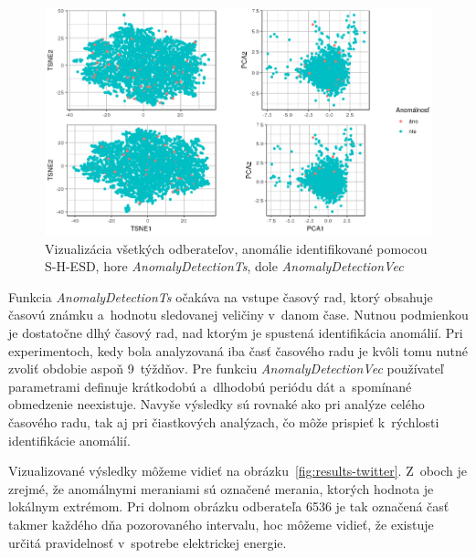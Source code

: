 \documentclass[a4paper,twoside,slovak,12pt,appendix]{article}
\begin{document}
\begin{figure}[htbp]
  \centering
  \includegraphics[width=\textwidth]{twitter_visualization.png}
  \caption[Vizualizácia všetkých odberateľov, anomálie identifikované pomocou S-H-ESD.]{Vizualizácia všetkých odberateľov, anomálie identifikované pomocou S-H-ESD, hore \textit{AnomalyDetectionTs}, dole \textit{AnomalyDetectionVec}}
  \label{fig:twitter-results}
\end{figure}

Funkcia \textit{AnomalyDetectionTs} očakáva na vstupe časový rad, ktorý obsahuje
časovú známku a~hodnotu sledovanej veličiny v~danom čase. Nutnou podmienkou je
dostatočne dlhý časový rad, nad ktorým je spustená identifikácia anomálií. Pri
experimentoch, kedy bola analyzovaná iba časť časového radu je kvôli tomu nutné
zvoliť obdobie aspoň 9~týždňov. Pre funkciu \textit{AnomalyDetectionVec}
používateľ parametrami definuje krátkodobú a~dlhodobú periódu dát a~spomínané
obmedzenie neexistuje. Navyše výsledky sú rovnaké ako pri analýze celého
časového radu, tak aj pri čiastkových analýzach, čo môže prispieť k~rýchlosti
identifikácie anomálií.

Vizualizované výsledky môžeme vidieť na obrázku~\ref{fig:results-twitter}.
Z~oboch je zrejmé, že anomálnymi meraniami sú označené merania, ktorých hodnota
je lokálnym extrémom. Pri dolnom obrázku odberateľa 6536 je tak označená časť
takmer každého dňa pozorovaného intervalu, hoc môžeme vidieť, že existuje určitá
pravidelnosť v~spotrebe elektrickej energie.
\end{document}
